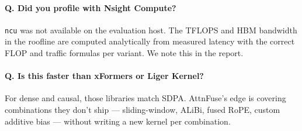 \documentclass[11pt]{article}
\begin{document}
\paragraph{Q. Did you profile with Nsight Compute?}
\texttt{ncu} was not available on the evaluation host. The TFLOPS and
HBM bandwidth in the roofline are computed analytically from measured
latency with the correct FLOP and traffic formulas per variant. We note
this in the report.

\paragraph{Q. Is this faster than xFormers or Liger Kernel?}
For dense and causal, those libraries match SDPA. AttnFuse's edge is
covering combinations they don't ship --- sliding-window, ALiBi,
fused RoPE, custom additive bias --- without writing a new kernel per
combination.
\end{document}
